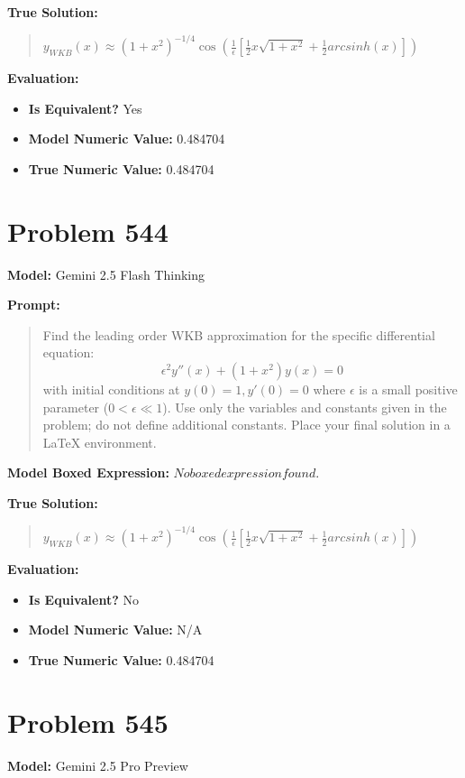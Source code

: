 \documentclass{article}
\begin{document}
\textbf{True Solution:}
\begin{quote}
$y_{WKB}(x) \approx (1+x^2)^{-1/4} \cos\left( \frac{1}{\epsilon} \left[ \frac{1}{2} x \sqrt{1+x^2} + \frac{1}{2} arcsinh(x) \right] \right)$
\end{quote}

\textbf{Evaluation:}
\begin{itemize}
\item \textbf{Is Equivalent?} Yes
\item \textbf{Model Numeric Value:} 0.484704
\item \textbf{True Numeric Value:} 0.484704
\end{itemize}
\vspace{1cm}
\section*{Problem 544}
\textbf{Model:} Gemini 2.5 Flash Thinking

\textbf{Prompt:}
\begin{quote}
Find the leading order WKB approximation for the specific differential equation: $$ \epsilon^2 y''(x) + (1+x^2) y(x) = 0 $$ with initial conditions at $y(0) = 1, y'(0) = 0$ where $\epsilon$ is a small positive parameter ($0 < \epsilon \ll 1$). Use only the variables and constants given in the problem; do not define additional constants. Place your final solution in a $\boxed{}$ LaTeX environment.
\end{quote}
\textbf{Model Boxed Expression:} $No boxed expression found.$

\textbf{True Solution:}
\begin{quote}
$y_{WKB}(x) \approx (1+x^2)^{-1/4} \cos\left( \frac{1}{\epsilon} \left[ \frac{1}{2} x \sqrt{1+x^2} + \frac{1}{2} arcsinh(x) \right] \right)$
\end{quote}

\textbf{Evaluation:}
\begin{itemize}
\item \textbf{Is Equivalent?} No
\item \textbf{Model Numeric Value:} N/A
\item \textbf{True Numeric Value:} 0.484704
\end{itemize}
\vspace{1cm}
\section*{Problem 545}
\textbf{Model:} Gemini 2.5 Pro Preview
\end{document}
